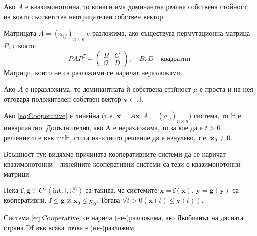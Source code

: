 \begin{theorem}
  Ако $A$ е квазимонотонна, то винаги има доминантна реална собствена стойност, на която съответства неотрицателен собствен вектор.
\end{theorem}

\begin{definition}
  Матрицата $A=(a_{ij})_{n \times n}$ e разложима, ако съществува пермутационна матрица $P$, с която:
  \begin{equation*}
    PAP^T =
    \begin{pmatrix}
      B & C \\
      \mathscr{O} & D
    \end{pmatrix}, \quad B, D \text{ - квадратни}
  \end{equation*}
  Матрици, които не са разложими се наричат неразложими.
\end{definition}

\begin{theorem}
  Ако $A$ е неразложима, то доминантната ѝ собствена стойност $\mu$ е проста и на нея отговаря положителен собствен вектор $\mathbf{v} \in \mathbb{H}$.
\end{theorem}

\begin{theorem}
  Ако \eqref{eq:Cooperative} е линейна (т.е. $\dot{\mathbf{x}} = A \mathbf{x}, A = (a_{ij})_{n \times n}$) система, то $\mathbb{H}$ е инвариантно. Допълнително, ако A е неразложима, то за кое да е $t > 0$ решението е във $\mathrm{int} \mathbb{H}$, стига началното решение да е ненулево, т.е. $\mathbf{x}_0 \neq \mathbf{0}$.
\end{theorem}

Всъщност тук видяхме причината кооперативните системи да се наричат квазимонотонни - линейните кооперативни системи са тези с квазимонотонни матрици.

\begin{theorem}
  \label{thm:Comparison}
  Нека $\mathbf{f}, \mathbf{g} \in C^1(\mathrm{int} \mathbb{H}, \mathbb{R}^n)$ са такива, че системите $\dot{\mathbf{x}}=\mathbf{f}(\mathbf{x})$, $\dot{\mathbf{y}}=\mathbf{g}(\mathbf{y})$ са кооперативни, $\mathbf{f} \leq \mathbf{g}$ и $\mathbf{x}_0 \leq \mathbf{y}_0$. Тогава $\forall{t>0}(\mathbf{x}(t) \leq \mathbf{y}(t))$.
\end{theorem}

\begin{definition}
  Система \eqref{eq:Cooperative} се нарича (не-)разложима, ако Якобианът на дясната страна $\mathrm{D}\mathbf{f}$ във всяка точка е (не-)разложим.
\end{definition}

